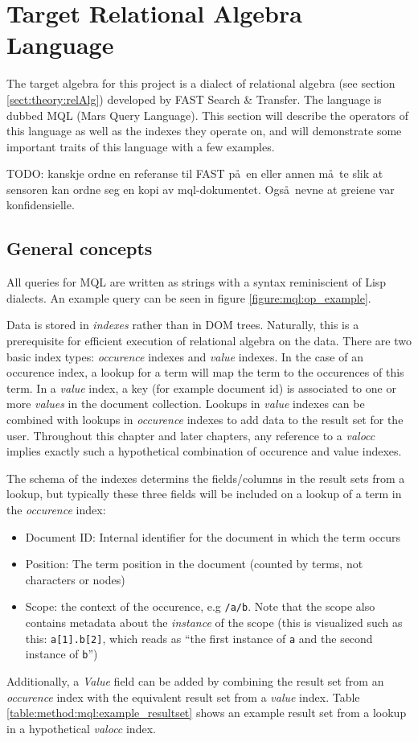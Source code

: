 \section{Target Relational Algebra Language}
\label{sect:method:mql}
The target algebra for this project is a dialect of relational algebra (see
section \ref{sect:theory:relAlg}) developed by FAST Search \& Transfer. The
language is dubbed MQL (Mars Query Language). This section will describe the
operators of this language as well as the indexes they operate on, and will
demonstrate some important traits of this language with a few examples. 

TODO: kanskje ordne en referanse til FAST p\aa~en eller annen m\aa~te slik at
sensoren kan ordne seg en kopi av mql-dokumentet. Ogs\aa~nevne at greiene var
konfidensielle.

\subsection{General concepts}
\label{sect:method:mql:indexes}
\label{sect:method:mql:concepts}
All queries for MQL are written as strings with a syntax reminiscient of Lisp
dialects. An example query can be seen in figure \ref{figure:mql:op_example}.

Data is stored in \textit{indexes} rather than in DOM trees. Naturally, this is a prerequisite for efficient
execution of relational algebra on the data. There are two basic index types: \textit{occurence} indexes and
\textit{value} indexes. In the case of an occurence index, a lookup for a term will map the term to the occurences
of this term. In a \textit{value} index, a key (for example document id) is associated to one or more
\textit{values} in the document collection. Lookups in \textit{value} indexes can be combined with lookups in
\textit{occurence} indexes to add data to the result set for the user.
Throughout this chapter and later chapters, any reference to a \textit{valocc}
implies exactly such a hypothetical combination of occurence and value indexes.

The schema of the indexes determins the fields/columns in the result sets from
a lookup, but typically these three fields will be included on a lookup of a
term in the \textit{occurence} index:
\begin{itemize}
  \item Document ID: Internal identifier for the document in which the term
  occurs
  \item Position: The term position in the document (counted by terms, not
  characters or nodes)
  \item Scope: the context of the occurence, e.g \texttt{/a/b}. Note that the
  scope also contains metadata about the \textit{instance} of the scope (this
  is visualized such as this: \texttt{a[1].b[2]}, which reads as ``the first
  instance of \texttt{a} and the second instance of \texttt{b}'')
\end{itemize}
Additionally, a \textit{Value} field can be added by combining the result set
from an \textit{occurence} index with the equivalent result set from a \textit{value}
index. Table \ref{table:method:mql:example_resultset} shows an example result
set from a lookup in a hypothetical \textit{valocc} index.

